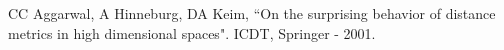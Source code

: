 \documentclass[conference]{IEEEtran}
\begin{document}
\begin{thebibliography}{00}
 CC Aggarwal, A Hinneburg, DA Keim, ``On the surprising behavior of distance metrics in high dimensional spaces". ICDT, Springer - 2001.
\end{thebibliography}
\end{document}
